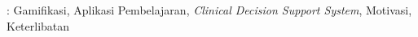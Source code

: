 
: Gamifikasi, Aplikasi Pembelajaran, \textit{Clinical Decision Support System}, Motivasi, Keterlibatan

\vspace{1cm}




